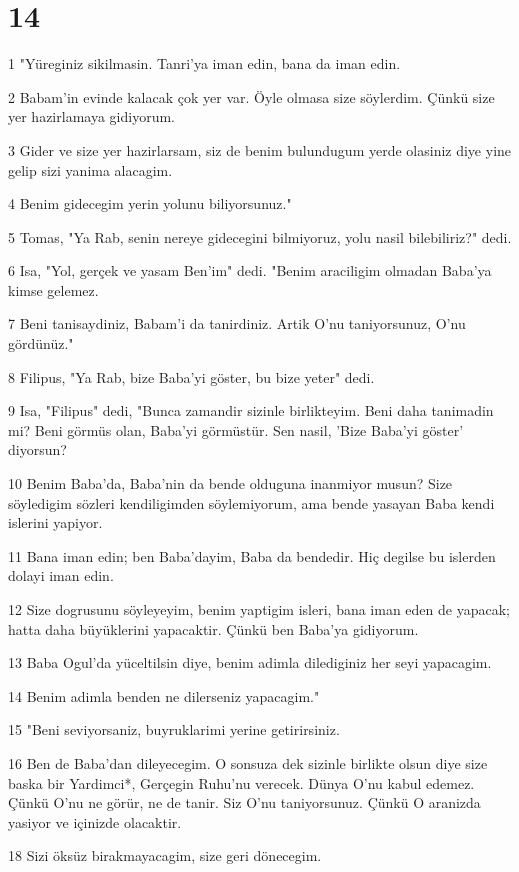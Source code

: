 \chapter{14}

\par 1 "Yüreginiz sikilmasin. Tanri'ya iman edin, bana da iman edin.
\par 2 Babam'in evinde kalacak çok yer var. Öyle olmasa size söylerdim. Çünkü size yer hazirlamaya gidiyorum.
\par 3 Gider ve size yer hazirlarsam, siz de benim bulundugum yerde olasiniz diye yine gelip sizi yanima alacagim.
\par 4 Benim gidecegim yerin yolunu biliyorsunuz."
\par 5 Tomas, "Ya Rab, senin nereye gidecegini bilmiyoruz, yolu nasil bilebiliriz?" dedi.
\par 6 Isa, "Yol, gerçek ve yasam Ben'im" dedi. "Benim araciligim olmadan Baba'ya kimse gelemez.
\par 7 Beni tanisaydiniz, Babam'i da tanirdiniz. Artik O'nu taniyorsunuz, O'nu gördünüz."
\par 8 Filipus, "Ya Rab, bize Baba'yi göster, bu bize yeter" dedi.
\par 9 Isa, "Filipus" dedi, "Bunca zamandir sizinle birlikteyim. Beni daha tanimadin mi? Beni görmüs olan, Baba'yi görmüstür. Sen nasil, 'Bize Baba'yi göster' diyorsun?
\par 10 Benim Baba'da, Baba'nin da bende olduguna inanmiyor musun? Size söyledigim sözleri kendiligimden söylemiyorum, ama bende yasayan Baba kendi islerini yapiyor.
\par 11 Bana iman edin; ben Baba'dayim, Baba da bendedir. Hiç degilse bu islerden dolayi iman edin.
\par 12 Size dogrusunu söyleyeyim, benim yaptigim isleri, bana iman eden de yapacak; hatta daha büyüklerini yapacaktir. Çünkü ben Baba'ya gidiyorum.
\par 13 Baba Ogul'da yüceltilsin diye, benim adimla dilediginiz her seyi yapacagim.
\par 14 Benim adimla benden ne dilerseniz yapacagim."
\par 15 "Beni seviyorsaniz, buyruklarimi yerine getirirsiniz.
\par 16 Ben de Baba'dan dileyecegim. O sonsuza dek sizinle birlikte olsun diye size baska bir Yardimci*, Gerçegin Ruhu'nu verecek. Dünya O'nu kabul edemez. Çünkü O'nu ne görür, ne de tanir. Siz O'nu taniyorsunuz. Çünkü O aranizda yasiyor ve içinizde olacaktir.
\par 18 Sizi öksüz birakmayacagim, size geri dönecegim.

